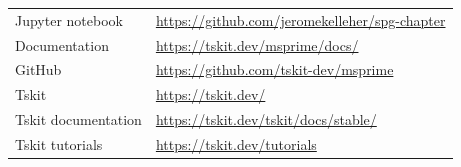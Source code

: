 \documentclass[graybox]{svmult}
\begin{document}
\begin{tabular}{ll}
Jupyter notebook & \url{https://github.com/jeromekelleher/spg-chapter} \\
Documentation & \url{https://tskit.dev/msprime/docs/} \\
GitHub & \url{https://github.com/tskit-dev/msprime} \\
Tskit & \url{https://tskit.dev/} \\
Tskit documentation & \url{https://tskit.dev/tskit/docs/stable/} \\
Tskit tutorials & \url{https://tskit.dev/tutorials} \\
\end{tabular}


\end{document}
